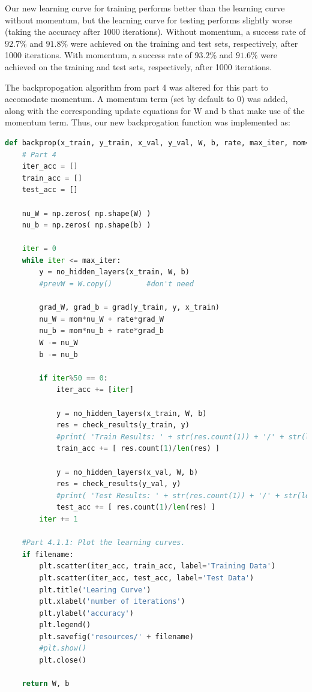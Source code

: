 \documentclass{article}
\begin{document}
  Our new learning curve for training performs better than the learning curve without momentum,
 but the learning curve for testing performs slightly worse (taking the accuracy after 1000 iterations).
 Without momentum, a success rate of $ 92.7\%$ and $ 91.8\%$ were achieved on the training and test sets, respectively, 
 after 1000 iterations.
 With  momentum,  a success rate of $93.2\%$ and $91.6\%$ were achieved on the training and test sets, respectively, 
 after 1000 iterations.

  The backpropogation algorithm from part 4 was altered for this part to accomodate momentum.
  A momentum term (set by default to 0) was added, along with  the corresponding update equations
  for W and b that make use of the momentum term.  
 Thus, our new backprogation function was implemented as:
 \begin{lstlisting}[language=Python]
  	def backprop(x_train, y_train, x_val, y_val, W, b, rate, max_iter, mom=0, filename=''):
    # Part 4
    iter_acc = []
    train_acc = []
    test_acc = []
    
    nu_W = np.zeros( np.shape(W) )
    nu_b = np.zeros( np.shape(b) )
    
    iter = 0
    while iter <= max_iter:
        y = no_hidden_layers(x_train, W, b)
        #prevW = W.copy()        #don't need
        
        grad_W, grad_b = grad(y_train, y, x_train)
        nu_W = mom*nu_W + rate*grad_W
        nu_b = mom*nu_b + rate*grad_b
        W -= nu_W
        b -= nu_b
        
        if iter%50 == 0:
            iter_acc += [iter]
            
            y = no_hidden_layers(x_train, W, b)
            res = check_results(y_train, y)
            #print( 'Train Results: ' + str(res.count(1)) + '/' + str(len(res)) )
            train_acc += [ res.count(1)/len(res) ]
            
            y = no_hidden_layers(x_val, W, b)
            res = check_results(y_val, y)
            #print( 'Test Results: ' + str(res.count(1)) + '/' + str(len(res)) ) 
            test_acc += [ res.count(1)/len(res) ]
        iter += 1
    
    #Part 4.1.1: Plot the learning curves. 
    if filename:
        plt.scatter(iter_acc, train_acc, label='Training Data')
        plt.scatter(iter_acc, test_acc, label='Test Data')
        plt.title('Learing Curve')
        plt.xlabel('number of iterations')
        plt.ylabel('accuracy')
        plt.legend()
        plt.savefig('resources/' + filename)
        #plt.show()
        plt.close()
    
    return W, b
\end{lstlisting}
\end{document}
